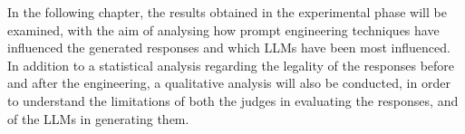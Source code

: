 In the following chapter, the results obtained in the experimental phase will be examined, with the aim of analysing how prompt engineering techniques have influenced the generated responses and which LLMs have been most influenced. In addition to a statistical analysis regarding the legality of the responses before and after the engineering, a qualitative analysis will also be conducted, in order to understand the limitations of both the judges in evaluating the responses, and of the LLMs in generating them.
